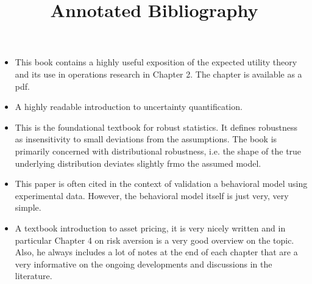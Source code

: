 

\title{Annotated Bibliography}
\author{}
\date{}



\maketitle
\begin{itemize}
\item {}
This book contains a highly useful exposition of the expected utility theory and its use in operations research in Chapter 2. The chapter is available as a pdf.

\item {}
A highly readable introduction to uncertainty quantification.

\item {}

This is the foundational textbook for robust statistics. It defines robustness as insensitivity to small deviations from the assumptions. The book is primarily concerned with distributional robustness, i.e. the shape of the true underlying distribution deviates slightly frmo the assumed model.

\item {}

This paper is often cited in the context of validation a behavioral model using experimental data. However, the behavioral model itself is just very, very simple.

\item {}

A textbook introduction to asset pricing, it is very nicely written and in particular Chapter 4 on risk aversion is a very good overview on the topic. Also,  he always includes a lot of notes at the end of each chapter that are a very informative on the ongoing developments and discussions in the literature.

\end{itemize}





